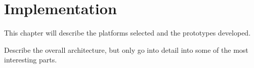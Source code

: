 \chapter{Implementation}
This chapter will describe the platforms selected and the prototypes developed.


Describe the overall architecture, but only go into detail into some of the most interesting parts.







